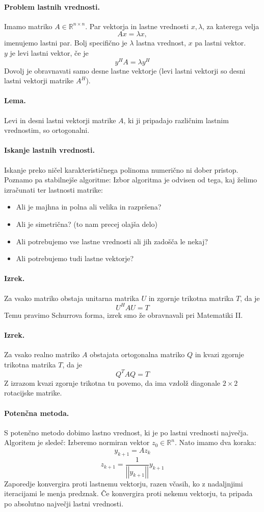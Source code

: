 \documentclass[a4paper]{article}
\newcommand{\R}{\mathbb{R}}
\newcommand{\norm}[1]{\left|\left|#1\right|\right|}
\begin{document}
\paragraph{Problem lastnih vrednosti.} Imamo matriko \(A \in \R^{n \times n}\). Par vektorja in lastne vrednosti \(x, \lambda\), za katerega velja
\[Ax = \lambda x,\] imenujemo lastni par. Bolj specifično je \(\lambda\) lastna vrednost, \(x\) pa lastni vektor. \\
\(y\) je levi lastni vektor, če je \[y^H A = \lambda y^H\]
Dovolj je obravnavati samo desne lastne vektorje (levi lastni vektorji so desni lastni vektorji matrike \(A^H\)).
\paragraph{Lema.} Levi in desni lastni vektorji matrike \(A\), ki ji pripadajo različnim lastnim vrednostim, so ortogonalni.
\paragraph{Iskanje lastnih vrednosti.} Iskanje preko ničel karakterističnega polinoma numerično ni dober pristop. Poznamo pa stabilnejše algoritme:
Izbor algoritma je odvisen od tega, kaj želimo izračunati ter lastnosti matrike:
\begin{itemize}
    \item Ali je majhna in polna ali velika in razpršena?
    \item Ali je simetrična? (to nam precej olajša delo)
    \item Ali potrebujemo vse lastne vrednosti ali jih zadošča le nekaj?
    \item Ali potrebujemo tudi lastne vektorje?
\end{itemize} 
\paragraph{Izrek.} Za vsako matriko obstaja unitarna matrika \(U\) in zgornje trikotna matrika \(T\), da je \[U^H A U = T\]
Temu pravimo Schurrova forma, izrek smo že obravnavali pri Matematiki II.
\paragraph{Izrek.} Za vsako realno matriko \(A\) obstajata ortogonalna matriko \(Q\) in kvazi zgornje trikotna matrika \(T\),
da je \[Q^TAQ =T\]
Z izrazom kvazi zgornje trikotna tu povemo, da ima vzdolž diagonale \(2 \times 2\) rotacijske matrike.
\paragraph{Potenčna metoda.} S potenčno metodo dobimo lastno vrednost, ki je po lastni vrednosti največja. \\
Algoritem je sledeč: Izberemo normiran vektor \(z_0 \in \R^n\). Nato imamo dva koraka:
\[y_{k+1} = Az_k\]
\[z_{k+1} = \frac{1}{\norm{y_{k+1}}}y_{k+1}\]
Zaporedje konvergira proti lastnemu vektorju, razen včasih, ko z nadaljnjimi iteracijami le menja predznak. Če konvergira proti nekemu vektorju, ta pripada
po absolutno največji lastni vrednosti.
\end{document}
